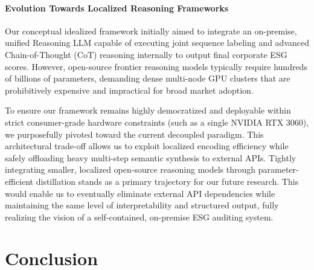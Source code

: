 \documentclass{article}
\theoremstyle{plain}
\theoremstyle{definition}
\theoremstyle{remark}
\begin{document}
\begin{center}
\color{red}
\noindent{}
\end{center}

\paragraph{Evolution Towards Localized Reasoning Frameworks} 
Our conceptual idealized framework initially aimed to integrate an on-premise, unified Reasoning LLM capable of executing joint sequence labeling and advanced Chain-of-Thought (CoT) reasoning internally to output final corporate ESG scores. However, open-source frontier reasoning models typically require hundreds of billions of parameters, demanding dense multi-node GPU clusters that are prohibitively expensive and impractical for broad market adoption. 

To ensure our framework remains highly democratized and deployable within strict consumer-grade hardware constraints (such as a single NVIDIA RTX 3060), we purposefully pivoted toward the current decoupled paradigm. This architectural trade-off allows us to exploit localized encoding efficiency while safely offloading heavy multi-step semantic synthesis to external APIs. Tightly integrating smaller, localized open-source reasoning models through parameter-efficient distillation stands as a primary trajectory for our future research. This would enable us to eventually eliminate external API dependencies while maintaining the same level of interpretability and structured output, fully realizing the vision of a self-contained, on-premise ESG auditing system.
\section{Conclusion}
\label{sec:conclusion}
\end{document}
